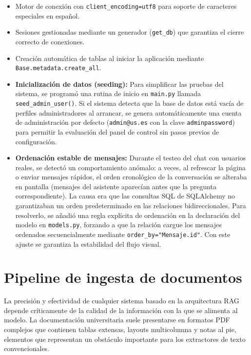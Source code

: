 \documentclass[12pt,a4paper,oneside]{report}
\begin{document}
\begin{itemize}
    \item Motor de conexión con \texttt{client\_encoding=utf8} para soporte de caracteres especiales en español.
    \item Sesiones gestionadas mediante un generador (\texttt{get\_db}) que garantiza el cierre correcto de conexiones.
    \item Creación automática de tablas al iniciar la aplicación mediante \texttt{Base.metadata.create\_all}.
    \item \textbf{Inicialización de datos (seeding):} Para simplificar las pruebas del sistema, se programó una rutina de inicio en \texttt{main.py} llamada \texttt{seed\_admin\_user()}. Si el sistema detecta que la base de datos está vacía de perfiles administradores al arrancar, se genera automáticamente una cuenta de administración por defecto (\texttt{admin@us.es} con la clave \texttt{adminpassword}) para permitir la evaluación del panel de control sin pasos previos de configuración.
    \item \textbf{Ordenación estable de mensajes:} Durante el testeo del chat con usuarios reales, se detectó un comportamiento anómalo: a veces, al refrescar la página o enviar mensajes rápidos, el orden cronológico de la conversación se alteraba en pantalla (mensajes del asistente aparecían antes que la pregunta correspondiente). La causa era que las consultas SQL de SQLAlchemy no garantizaban un orden predeterminado en las relaciones bidireccionales. Para resolverlo, se añadió una regla explícita de ordenación en la declaración del modelo en \texttt{models.py}, forzando a que la relación cargue los mensajes ordenados secuencialmente mediante \texttt{order\_by="Mensaje.id"}. Con este ajuste se garantiza la estabilidad del flujo visual.
\end{itemize}

\chapter{Pipeline de ingesta de documentos}

La precisión y efectividad de cualquier sistema basado en la arquitectura RAG depende críticamente de la calidad de la información con la que se alimenta al modelo. La documentación universitaria suele presentarse en formatos PDF complejos que contienen tablas extensas, layouts multicolumna y notas al pie, elementos que representan un obstáculo importante para los extractores de texto convencionales.
\end{document}
